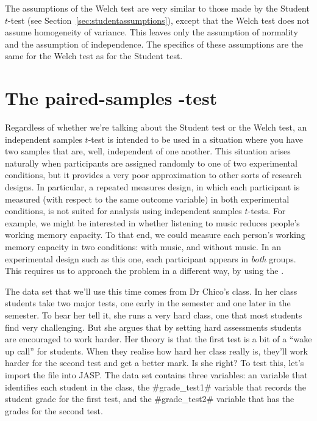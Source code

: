 
The assumptions of the Welch test are very similar to those made by the Student $t$-test (see Section~\ref{sec:studentassumptions}), except that the Welch test does not assume homogeneity of variance. This leaves only the assumption of normality and the assumption of independence. The specifics of these assumptions are the same for the Welch test as for the Student test. 

\vspace*{12pt}


\section{The paired-samples \texorpdfstring{}{}-test~\label{sec:pairedsamplesttest}}

Regardless of whether we're talking about the Student test or the Welch test, an independent samples $t$-test is intended to be used in a situation where you have two samples that are, well, independent of one another. This situation arises naturally when participants are assigned randomly to one of two experimental conditions, but it provides a very poor approximation to other sorts of research designs. In particular, a repeated measures design, in which each participant is measured (with respect to the same outcome variable) in both experimental conditions, is not suited for analysis using independent samples $t$-tests. For example, we might be interested in whether listening to music reduces people's working memory capacity. To that end, we could measure each person's working memory capacity in two conditions: with music, and without music. In an experimental design such as this one, each participant appears in {\it both} groups. This requires us to approach the problem in a different way, by using the . 


The data set that we'll use this time comes from Dr Chico's class. In her class students take two major tests, one early in the semester and one later in the semester. To hear her tell it, she runs a very hard class, one that most students find very challenging. But she argues that by setting hard assessments students are encouraged to work harder. Her theory is that the first test is a bit of a ``wake up call'' for students. When they realise how hard her class really is, they'll work harder for the second test and get a better mark. Is she right? To test this, let's import the  file into JASP. The  data set contains three variables: an  variable that identifies each student in the class, the \rtextverb#grade_test1# variable that records the student grade for the first test, and the \rtextverb#grade_test2# variable that has the grades for the second test. 

